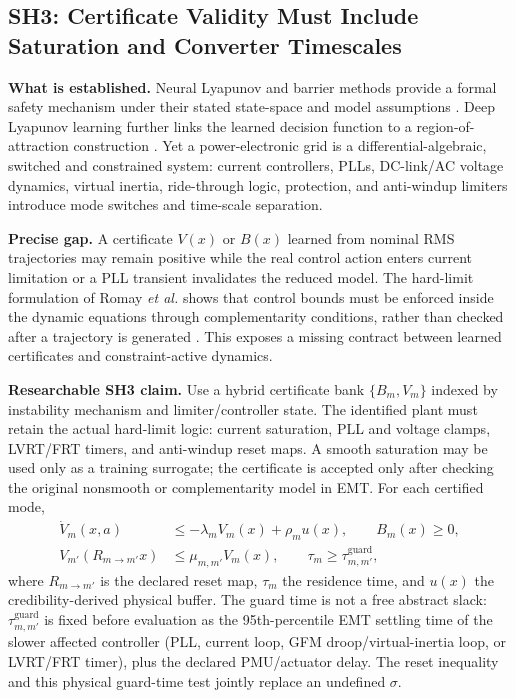 \documentclass[conference]{IEEEtran}
\begin{document}
\subsection{SH3: Certificate Validity Must Include Saturation and Converter Timescales}

\textbf{What is established.} Neural Lyapunov and barrier methods provide a formal safety mechanism under their stated state-space and model assumptions \cite{zhao2022,zhao2023}. Deep Lyapunov learning further links the learned decision function to a region-of-attraction construction \cite{liu2024dll}. Yet a power-electronic grid is a differential-algebraic, switched and constrained system: current controllers, PLLs, DC-link/AC voltage dynamics, virtual inertia, ride-through logic, protection, and anti-windup limiters introduce mode switches and time-scale separation.

\textbf{Precise gap.} A certificate $V(x)$ or $B(x)$ learned from nominal RMS trajectories may remain positive while the real control action enters current limitation or a PLL transient invalidates the reduced model. The hard-limit formulation of Romay \emph{et al.} shows that control bounds must be enforced inside the dynamic equations through complementarity conditions, rather than checked after a trajectory is generated \cite{romay2021}. This exposes a missing contract between learned certificates and constraint-active dynamics.

\textbf{Researchable SH3 claim.} Use a hybrid certificate bank $\{B_m,V_m\}$ indexed by instability mechanism and limiter/controller state. The identified plant must retain the actual hard-limit logic: current saturation, PLL and voltage clamps, LVRT/FRT timers, and anti-windup reset maps. A smooth saturation may be used only as a training surrogate; the certificate is accepted only after checking the original nonsmooth or complementarity model in EMT. For each certified mode,
\begin{equation}
\begin{aligned}
\dot V_m(x,a)&\leq-\lambda_m V_m(x)+\rho_m u(x),\qquad B_m(x)\geq0,\\
V_{m'}\!\left(R_{m\rightarrow m'}x\right)&\leq\mu_{m,m'}V_m(x),\qquad
\tau_m\geq\tau^{\mathrm{guard}}_{m,m'},
\end{aligned}
\label{eq:hybridcertificate}
\end{equation}
where $R_{m\rightarrow m'}$ is the declared reset map, $\tau_m$ the residence time, and $u(x)$ the credibility-derived physical buffer. The guard time is not a free abstract slack: $\tau^{\mathrm{guard}}_{m,m'}$ is fixed before evaluation as the 95th-percentile EMT settling time of the slower affected controller (PLL, current loop, GFM droop/virtual-inertia loop, or LVRT/FRT timer), plus the declared PMU/actuator delay. The reset inequality and this physical guard-time test jointly replace an undefined $\sigma$.
\end{document}
